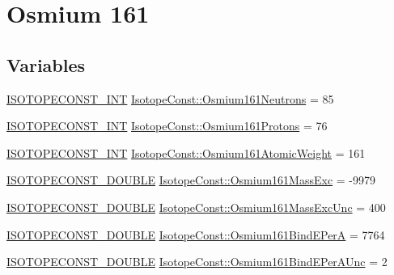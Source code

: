 \hypertarget{group___isotope_const-_osmium-_os161}{}\section{Osmium 161}
\label{group___isotope_const-_osmium-_os161}
\subsection*{Variables}
\begin{DoxyCompactItemize}
\item 
\mbox{\hyperlink{group___isotope_const-_macros_ga5f18360b3e99483a35c32d789e62621c}{I\+S\+O\+T\+O\+P\+E\+C\+O\+N\+S\+T\+\_\+\+I\+NT}} \mbox{\hyperlink{group___isotope_const-_osmium-_os161_ga47e60c6eac526e0391b9424cfbbc8ffe}{Isotope\+Const\+::\+Osmium161\+Neutrons}} = 85
\item 
\mbox{\hyperlink{group___isotope_const-_macros_ga5f18360b3e99483a35c32d789e62621c}{I\+S\+O\+T\+O\+P\+E\+C\+O\+N\+S\+T\+\_\+\+I\+NT}} \mbox{\hyperlink{group___isotope_const-_osmium-_os161_ga28c015e0b41ce576733863864d61b3ca}{Isotope\+Const\+::\+Osmium161\+Protons}} = 76
\item 
\mbox{\hyperlink{group___isotope_const-_macros_ga5f18360b3e99483a35c32d789e62621c}{I\+S\+O\+T\+O\+P\+E\+C\+O\+N\+S\+T\+\_\+\+I\+NT}} \mbox{\hyperlink{group___isotope_const-_osmium-_os161_ga3b2d66d8ebf6af7a173901a51edcc85d}{Isotope\+Const\+::\+Osmium161\+Atomic\+Weight}} = 161
\item 
\mbox{\hyperlink{group___isotope_const-_macros_ga8f45a7272ce02c0b4c65c44636ed719a}{I\+S\+O\+T\+O\+P\+E\+C\+O\+N\+S\+T\+\_\+\+D\+O\+U\+B\+LE}} \mbox{\hyperlink{group___isotope_const-_osmium-_os161_gaddbc92fdc0ad603db0ebd08234524a9c}{Isotope\+Const\+::\+Osmium161\+Mass\+Exc}} = -\/9979
\item 
\mbox{\hyperlink{group___isotope_const-_macros_ga8f45a7272ce02c0b4c65c44636ed719a}{I\+S\+O\+T\+O\+P\+E\+C\+O\+N\+S\+T\+\_\+\+D\+O\+U\+B\+LE}} \mbox{\hyperlink{group___isotope_const-_osmium-_os161_gaca84342ad8e6cf31fd624b226feefcf3}{Isotope\+Const\+::\+Osmium161\+Mass\+Exc\+Unc}} = 400
\item 
\mbox{\hyperlink{group___isotope_const-_macros_ga8f45a7272ce02c0b4c65c44636ed719a}{I\+S\+O\+T\+O\+P\+E\+C\+O\+N\+S\+T\+\_\+\+D\+O\+U\+B\+LE}} \mbox{\hyperlink{group___isotope_const-_osmium-_os161_ga9671484289bd0a8528b8249b42e0dbbf}{Isotope\+Const\+::\+Osmium161\+Bind\+E\+PerA}} = 7764
\item 
\mbox{\hyperlink{group___isotope_const-_macros_ga8f45a7272ce02c0b4c65c44636ed719a}{I\+S\+O\+T\+O\+P\+E\+C\+O\+N\+S\+T\+\_\+\+D\+O\+U\+B\+LE}} \mbox{\hyperlink{group___isotope_const-_osmium-_os161_gac3cb99f46ffb416865635f2b9004af5a}{Isotope\+Const\+::\+Osmium161\+Bind\+E\+Per\+A\+Unc}} = 2

\end{DoxyCompactItemize}
